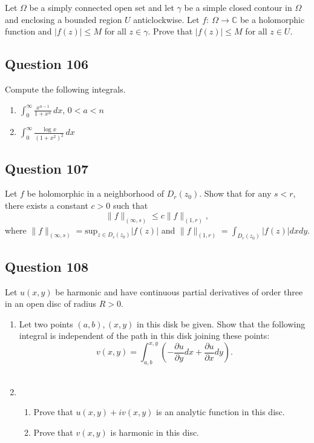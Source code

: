 \documentclass[12pt]{article}
\begin{document}
Let \(\Omega\) be a simply connected open set and let \(\gamma\) be a
simple closed contour in \(\Omega\) and enclosing a bounded region \(U\)
anticlockwise. Let \(f: \ \Omega \to {\mathbb C}\) be a holomorphic
function and \(|f(z)|\leq M\) for all \(z\in \gamma\). Prove that
\(|f(z)|\leq M\) for all \(z\in U\).

\hypertarget{question-106-1}{%
\subsection{Question 106}\label{question-106-1}}

Compute the following integrals.

\begin{enumerate}
\def\labelenumi{(\roman{enumi})}
\item
  \(\displaystyle \int_0^\infty \frac{x^{a-1}}{1 + x^n} \, dx\),
  \(0< a < n\)
\item
  \(\displaystyle \int_0^\infty \frac{\log x}{(1 + x^2)^2}\, dx\)
\end{enumerate}

\hypertarget{question-107-1}{%
\subsection{Question 107}\label{question-107-1}}

Let \(f\) be holomorphic in a neighborhood of \(D_r(z_0)\). Show that
for any \(s<r\), there exists a constant \(c>0\) such that
\[\|f\|_{(\infty, s)} \leq c \|f\|_{(1, r)},\] where
\(\displaystyle \|f\|_{(\infty, s)} = \text{sup}_{z \in D_s(z_0)}|f(z)|\)
and \(\displaystyle \|f\|_{(1, r)} = \int_{D_r(z_0)} |f(z)|dx dy\).

\hypertarget{question-108-1}{%
\subsection{Question 108}\label{question-108-1}}

Let \(u(x,y)\) be harmonic and have continuous partial derivatives of
order three in an open disc of radius \(R>0\).

\begin{enumerate}
\def\labelenumi{(\alph{enumi})}
\item
  Let two points \((a,b), (x,y)\) in this disk be given. Show that the
  following integral is independent of the path in this disk joining
  these points:
  \[v(x,y) = \int_{a,b}^{x,y} ( -\frac{\partial u}{\partial y}dx +  \frac{\partial u}{\partial x}dy).\]\\
\item
  \hfill

  \begin{enumerate}
  \def\labelenumii{(\roman{enumii})}
  \item
    Prove that \(u(x,y)+i v(x,y)\) is an analytic function in this disc.
  \item
    Prove that \(v(x,y)\) is harmonic in this disc.
  \end{enumerate}
\end{enumerate}
\end{document}

